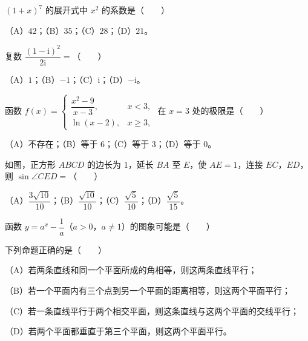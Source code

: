 

\begin{question}
$(1+x)^7$ 的展开式中 $x^2$ 的系数是\mbox{（　　）}

（A）$42$；（B）$35$；（C）$28$；（D）$21$。

\end{question}
\begin{question}
复数 $\dfrac{(1-\mathrm i)^2}{2\mathrm i}=$\mbox{（　　）}

（A）$1$；（B）$-1$；（C）$\mathrm i$；（D）$-\mathrm i$。

\end{question}
\begin{question}
函数 $f(x)=\begin{cases}\dfrac{x^2-9}{x-3},&x<3,\\[4pt]\ln(x-2),&x\geqslant3,\end{cases}$ 在 $x=3$ 处的极限是\mbox{（　　）}

（A）不存在；（B）等于 $6$；（C）等于 $3$；（D）等于 $0$。

\Needspace{0.4\textheight}
\end{question}
\begin{question}
如图，正方形 $ABCD$ 的边长为 $1$，延长 $BA$ 至 $E$，使 $AE=1$，连接 $EC$，$ED$，则 $\sin\angle CED=$\mbox{（　　）}
\nopagebreak[4]
\begin{center}\end{center}
\nopagebreak[4]
（A）$\dfrac{3\sqrt{10}}{10}$；（B）$\dfrac{\sqrt{10}}{10}$；（C）$\dfrac{\sqrt5}{10}$；（D）$\dfrac{\sqrt5}{15}$。

\Needspace{0.4\textheight}
\end{question}
\begin{question}
函数 $y=a^x-\dfrac1a$（$a>0$，$a\neq1$）的图象可能是\mbox{（　　）}
\nopagebreak[4]
\begin{center}\end{center}
\nopagebreak[4]
\end{question}
\begin{question}
下列命题正确的是\mbox{（　　）}

（A）若两条直线和同一个平面所成的角相等，则这两条直线平行；

（B）若一个平面内有三个点到另一个平面的距离相等，则这两个平面平行；

（C）若一条直线平行于两个相交平面，则这条直线与这两个平面的交线平行；

（D）若两个平面都垂直于第三个平面，则这两个平面平行。

\end{question}

